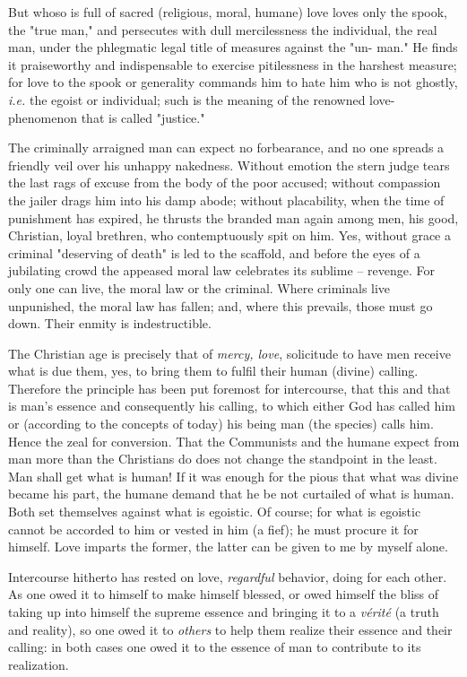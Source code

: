 \documentclass[a4paper]{book}
\begin{document}
But whoso is full of sacred (religious, moral, humane) love loves only the 
spook, the "{}true man,"{} and persecutes with dull mercilessness the 
individual, the real man, under the phlegmatic legal title of measures against 
the "{}un- man."{} He finds it praiseworthy and indispensable to exercise 
pitilessness in the harshest measure; for love to the spook or generality 
commands him to hate him who is not ghostly, \textit{i.e.} the egoist or 
individual; such is the meaning of the renowned love-phenomenon that is called 
"{}justice."{}

The criminally arraigned man can expect no forbearance, and no one spreads a 
friendly veil over his unhappy nakedness. Without emotion the stern judge 
tears the last rags of excuse from the body of the poor accused; without 
compassion the jailer drags him into his damp abode; without placability, when 
the time of punishment has expired, he thrusts the branded man again among 
men, his good, Christian, loyal brethren, who contemptuously spit on him. Yes, 
without grace a criminal "{}deserving of death"{} is led to the scaffold, and 
before the eyes of a jubilating crowd the appeased moral law celebrates its 
sublime -- revenge. For only one can live, the moral law or the criminal. 
Where criminals live unpunished, the moral law has fallen; and, where this 
prevails, those must go down. Their enmity is indestructible.

The Christian age is precisely that of \textit{mercy, love}, solicitude to 
have men receive what is due them, yes, to bring them to fulfil their human 
(divine) calling. Therefore the principle has been put foremost for 
intercourse, that this and that is man's essence and consequently his calling, 
to which either God has called him or (according to the concepts of today) his 
being man (the species) calls him. Hence the zeal for conversion. That the 
Communists and the humane expect from man more than the Christians do does not 
change the standpoint in the least. Man shall get what is human! If it was 
enough for the pious that what was divine became his part, the humane demand 
that he be not curtailed of what is human. Both set themselves against what is 
egoistic. Of course; for what is egoistic cannot be accorded to him or vested 
in him (a fief); he must procure it for himself. Love imparts the former, the 
latter can be given to me by myself alone.

Intercourse hitherto has rested on love, \textit{regardful} behavior, doing 
for each other. As one owed it to himself to make himself blessed, or owed 
himself the bliss of taking up into himself the supreme essence and bringing 
it to a \textit{v\'erit\'e} (a truth and reality), so one owed it to 
\textit{others} to help them realize their essence and their calling: in both 
cases one owed it to the essence of man to contribute to its realization.
\end{document}
